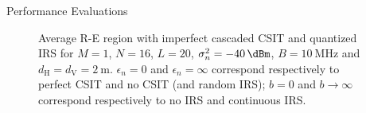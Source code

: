 \documentclass[journal]{IEEEtran}
\begin{document}
\begin{section}{Performance Evaluations}
		\begin{figure}[!t]
			\centering
			\caption{Average R-E region with imperfect cascaded CSIT and quantized IRS for $M=1$, $N=16$, $L=20$, $\sigma_n^2=\SI{-40}{\dBm}$, $B=\SI{10}{\MHz}$ and $d_{\mathrm{H}}=d_{\mathrm{V}}=\SI{2}{\meter}$. $\epsilon_{n}=0$ and $\epsilon_{n}=\infty$ correspond respectively to perfect CSIT and no CSIT (and random IRS); $b=0$ and $b \to \infty$ correspond respectively to no IRS and continuous IRS.}
		\end{figure}


\end{section}
\end{document}
